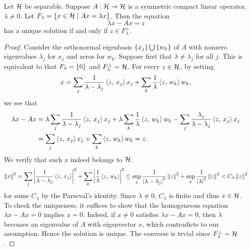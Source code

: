 \begin{theorem}
    Let $\mathcal{H}$ be separable. Suppose $A:\mathcal{H}\to\mathcal{H}$ is a symmetric compact 
    linear operator, $\lambda\neq 0$. Let $F_\lambda = \left\{ x\in\mathcal{H} \;\middle\vert\; Ax = \lambda x \right\}$. 
    Then the equation 
    \begin{equation*}
        \lambda x - Ax = z
    \end{equation*}
    has a unique solution if and only if $z\in F_\lambda^\perp$.
\end{theorem}
\begin{proof}
    Consider the orthonormal eigenbasis $\left\{ {x_j} \right\}\bigcup\left\{ {w_k} \right\}$ of $A$ with nonzero 
    eigenvalues $\lambda_j$ for $x_j$ and zeros for $w_k$. Suppose first that 
    $\lambda\neq\lambda_j$ for all $j$. This is equivalent to that $F_\lambda = \left\{ {0} \right\}$ and 
    $F_\lambda^\perp = \mathcal{H}$. For every $z\in\mathcal{H}$, by setting 
    \begin{equation*}
        x = \sum_j\frac{1}{\lambda-\lambda_j}\left\langle {z},\, {x_j} \right\rangle x_j + \sum_k\frac{1}{\lambda}\left\langle {z},\, {w_k} \right\rangle w_k,
    \end{equation*} 
    we see that 
    \begin{equation*}
        \begin{split}
            \lambda x - Ax 
            &= \lambda\sum_j\frac{1}{\lambda-\lambda_j}\left\langle {z},\, {x_j} \right\rangle x_j + \lambda\sum_k\frac{1}{\lambda}\left\langle {z},\, {w_k} \right\rangle w_k - \sum_j\frac{\lambda_j}{\lambda-\lambda_j}\left\langle {z},\, {x_j} \right\rangle x_j \\
            &= \sum_j\left\langle {z},\, {x_j} \right\rangle x_j + \sum_k\left\langle {z},\, {w_k} \right\rangle w_k = z.
        \end{split}
    \end{equation*}
    We verify that such $x$ indeed belongs to $\mathcal{H}$. 
    \begin{equation*}
        \left\lVert {x} \right\rVert^2 = \sum_j\left\lvert {\frac{1}{\lambda-\lambda_j}\left\langle {z},\, {x_j} \right\rangle} \right\rvert^2 + \sum_k\left\lvert {\frac{1}{\lambda}\left\langle {z},\, {w_k} \right\rangle} \right\rvert^2 
        \leq \sup_j\frac{1}{\left\lvert {\lambda-\lambda_j} \right\rvert^2}\left\lVert {z} \right\rVert^2 + \sup_k\frac{1}{\left\lvert {\lambda} \right\rvert^2}\left\lVert {z} \right\rVert^2 < C_\lambda\left\lVert {z} \right\rVert^2
    \end{equation*}
    for some $C_\lambda$ by the Parseval's identity. Since $\lambda\neq 0$, $C_\lambda$ is 
    finite and thus $x\in\mathcal{H}$. To check the uniqueness, it suffices to show that the 
    homogeneous equation $\lambda x - Ax = 0$ implies $x = 0$. Indeed, if $x\neq 0$ satisfies 
    $\lambda x - Ax = 0$, then $\lambda$ becomes an eigenvalue of $A$ with eigenvector $x$, 
    which contradicts to our assumption. Hence the solution is unique. The converse is trvial 
    since $F_\lambda^\perp = \mathcal{H}$.


\end{proof}
